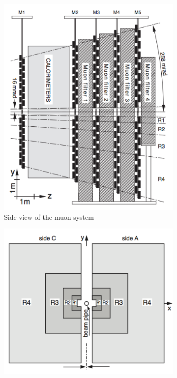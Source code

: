 \begin{figure}[htbp]
	\begin{center}
		\begin{subfigure}[b]{0.45\textwidth}
			\includegraphics[width=\textwidth]{./Chapters/detector/muon_system/muon_system_side_view.png}
			\caption{Side view of the muon system}
			\label{default}
		\end{subfigure}
		\begin{subfigure}[b]{0.45\textwidth}
			\includegraphics[width=\textwidth]{./Chapters/detector/muon_system/muon_regions.png}

\end{subfigure}
\end{center}
\end{figure}
